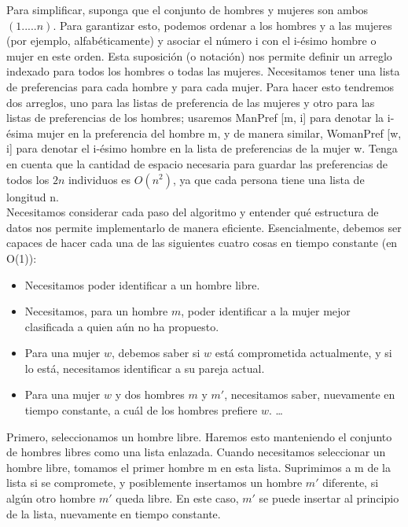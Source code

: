 \documentclass[a4paper, 12pt]{book}
\begin{document}
Para simplificar, suponga que el conjunto de hombres y mujeres son ambos $(1 ..... n)$. Para garantizar esto, podemos ordenar a los hombres y a las mujeres (por ejemplo, alfabéticamente) y asociar el número i con el i-ésimo hombre o mujer en este orden. Esta suposición (o notación) nos permite definir un arreglo indexado para todos los hombres o todas las mujeres. Necesitamos tener una lista de preferencias para cada hombre y para cada mujer. Para hacer esto tendremos dos arreglos, uno para las listas de preferencia de las mujeres y otro para las listas de preferencias de los hombres; usaremos ManPref [m, i] para denotar la i-ésima mujer en la preferencia del hombre m, y de manera similar, WomanPref [w, i] para denotar el i-ésimo hombre en la lista de preferencias de la mujer w. Tenga en cuenta que la cantidad de espacio necesaria para guardar las preferencias de todos los $2n$
individuos es $O(n^2)$, ya que cada persona tiene una lista de longitud n.\\

Necesitamos considerar cada paso del algoritmo y entender qué estructura de datos nos permite implementarlo de manera eficiente. Esencialmente, debemos ser capaces de hacer cada una de las siguientes cuatro cosas en tiempo constante (en O(1)):


\begin{itemize}
 \item Necesitamos poder identificar a un hombre libre. 
 
 \item Necesitamos, para un hombre $m$, poder identificar a la mujer mejor clasificada a quien aún no ha propuesto.
 
 \item Para una mujer $w$, debemos saber si $w$ está comprometida actualmente, y si lo está, necesitamos identificar a su pareja actual.
 
 \item Para una mujer $w$ y dos hombres $m$ y $m'$, necesitamos saber, nuevamente en tiempo constante, a cuál de los hombres prefiere $w$. \ldots 
\end{itemize}

 

Primero, seleccionamos un hombre libre. Haremos esto manteniendo el conjunto de hombres libres como una lista enlazada. Cuando necesitamos seleccionar un hombre libre, tomamos el primer hombre m en esta lista. Suprimimos a m de la lista si se compromete, y posiblemente insertamos un hombre $m'$ diferente, si algún otro hombre $m'$ queda libre. En este caso, $m'$ se puede insertar al principio de la lista, nuevamente en tiempo constante.\\
\end{document}
